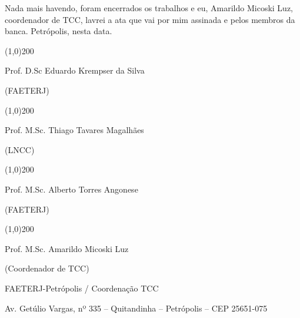 \documentclass[a4paper]{report} %
\begin{document}
\noindent Nada mais havendo, foram encerrados os trabalhos e eu, Amarildo Micoski Luz, coordenador de TCC, lavrei a ata que vai por mim assinada e pelos membros da banca. Petrópolis, nesta data.

\vspace*{2cm}

\begin{center}
\line(1,0){200}


Prof. D.Sc Eduardo Krempser da Silva


(FAETERJ)


% 
\vspace*{0.5cm}
%


\line(1,0){200}


Prof. M.Sc. Thiago Tavares Magalhães


(LNCC)


% 
\vspace*{0.5cm}
%


\line(1,0){200}


Prof. M.Sc. Alberto Torres Angonese


(FAETERJ)


% 
\vspace*{0.5cm}
%


\line(1,0){200}


Prof. M.Sc. Amarildo Micoski Luz


(Coordenador de TCC)


% 
\vspace*{1cm}
%


FAETERJ-Petrópolis / Coordenação TCC


Av. Getúlio Vargas, nº 335 – Quitandinha – Petrópolis – CEP 25651-075 


\end{center}
\end{document}
